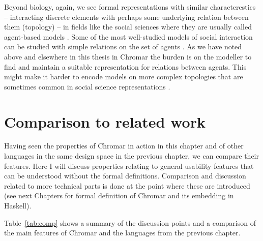 Beyond biology, again, we see formal representations with similar
characterestics -- interacting discrete elements with perhaps some underlying
relation between them (\eg topology) -- in fields like the social sciences where
they are usually called agent-based models \citep{abar2017agent,
  bonabeau2002agent}. Some of the most well-studied models of social interaction
can be studied with simple relations on the set of agents \citep[\eg segregation
dynamics on a regular lattice][]{schelling1971dynamic}. As we have noted above
and elsewhere in this thesis in Chromar the burden is on the modeller to find
and maintain a suitable representation for relations between agents. This might
make it harder to encode models on more complex topologies that are sometimes
common in social science representations \citep[\eg social
networks;][]{rodriguez2016collective, celli2010social}.


\section{Comparison to related work}
Having seen the properties of Chromar in action in this chapter and of other
languages in the same design space in the previous chapter, we can compare their
features. Here I will discuss properties relating to general usability features
that can be understood without the formal definitions. Comparison and discussion
related to more technical parts is done at the point where these are introduced
(see next Chapters for formal definition of Chromar and its embedding in
Haskell).

Table~\ref{tab:comp} shows a summary of the discussion points and a comparison
of the main features of Chromar and the languages from the previous chapter.

